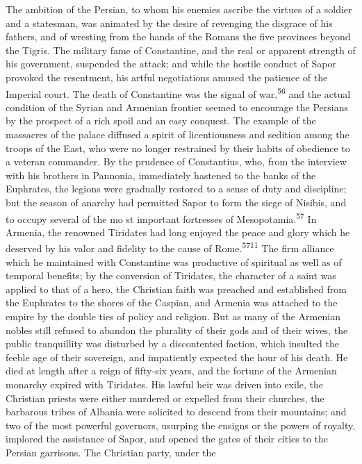 The ambition of the Persian, to whom his enemies ascribe the
virtues of a soldier and a statesman, was animated by the desire
of revenging the disgrace of his fathers, and of wresting from
the hands of the Romans the five provinces beyond the Tigris. The
military fame of Constantine, and the real or apparent strength
of his government, suspended the attack; and while the hostile
conduct of Sapor provoked the resentment, his artful negotiations
amused the patience of the Imperial court. The death of
Constantine was the signal of war,\textsuperscript{56} and the actual condition of
the Syrian and Armenian frontier seemed to encourage the Persians
by the prospect of a rich spoil and an easy conquest. The example
of the massacres of the palace diffused a spirit of
licentiousness and sedition among the troops of the East, who
were no longer restrained by their habits of obedience to a
veteran commander. By the prudence of Constantius, who, from the
interview with his brothers in Pannonia, immediately hastened to
the banks of the Euphrates, the legions were gradually restored
to a sense of duty and discipline; but the season of anarchy had
permitted Sapor to form the siege of Nisibis, and to occupy
several of the mo st important fortresses of Mesopotamia.\textsuperscript{57} In
Armenia, the renowned Tiridates had long enjoyed the peace and
glory which he deserved by his valor and fidelity to the cause of
Rome.\textsuperscript{5711} The firm alliance which he maintained with Constantine
was productive of spiritual as well as of temporal benefits; by
the conversion of Tiridates, the character of a saint was applied
to that of a hero, the Christian faith was preached and
established from the Euphrates to the shores of the Caspian, and
Armenia was attached to the empire by the double ties of policy
and religion. But as many of the Armenian nobles still refused to
abandon the plurality of their gods and of their wives, the
public tranquillity was disturbed by a discontented faction,
which insulted the feeble age of their sovereign, and impatiently
expected the hour of his death. He died at length after a reign
of fifty-six years, and the fortune of the Armenian monarchy
expired with Tiridates. His lawful heir was driven into exile,
the Christian priests were either murdered or expelled from their
churches, the barbarous tribes of Albania were solicited to
descend from their mountains; and two of the most powerful
governors, usurping the ensigns or the powers of royalty,
implored the assistance of Sapor, and opened the gates of their
cities to the Persian garrisons. The Christian party, under the
